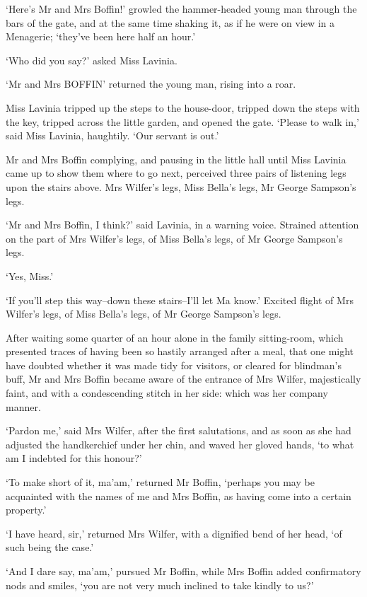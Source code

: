 ‘Here’s Mr and Mrs Boffin!’ growled the hammer-headed young man through
the bars of the gate, and at the same time shaking it, as if he were on
view in a Menagerie; ‘they’ve been here half an hour.’

‘Who did you say?’ asked Miss Lavinia.

‘Mr and Mrs BOFFIN’ returned the young man, rising into a roar.

Miss Lavinia tripped up the steps to the house-door, tripped down the
steps with the key, tripped across the little garden, and opened the
gate. ‘Please to walk in,’ said Miss Lavinia, haughtily. ‘Our servant is
out.’

Mr and Mrs Boffin complying, and pausing in the little hall until Miss
Lavinia came up to show them where to go next, perceived three pairs of
listening legs upon the stairs above. Mrs Wilfer’s legs, Miss Bella’s
legs, Mr George Sampson’s legs.

‘Mr and Mrs Boffin, I think?’ said Lavinia, in a warning voice. Strained
attention on the part of Mrs Wilfer’s legs, of Miss Bella’s legs, of Mr
George Sampson’s legs.

‘Yes, Miss.’

‘If you’ll step this way--down these stairs--I’ll let Ma know.’
Excited flight of Mrs Wilfer’s legs, of Miss Bella’s legs, of Mr George
Sampson’s legs.

After waiting some quarter of an hour alone in the family sitting-room,
which presented traces of having been so hastily arranged after a meal,
that one might have doubted whether it was made tidy for visitors,
or cleared for blindman’s buff, Mr and Mrs Boffin became aware of the
entrance of Mrs Wilfer, majestically faint, and with a condescending
stitch in her side: which was her company manner.

‘Pardon me,’ said Mrs Wilfer, after the first salutations, and as soon
as she had adjusted the handkerchief under her chin, and waved her
gloved hands, ‘to what am I indebted for this honour?’

‘To make short of it, ma’am,’ returned Mr Boffin, ‘perhaps you may be
acquainted with the names of me and Mrs Boffin, as having come into a
certain property.’

‘I have heard, sir,’ returned Mrs Wilfer, with a dignified bend of her
head, ‘of such being the case.’

‘And I dare say, ma’am,’ pursued Mr Boffin, while Mrs Boffin added
confirmatory nods and smiles, ‘you are not very much inclined to take
kindly to us?’

